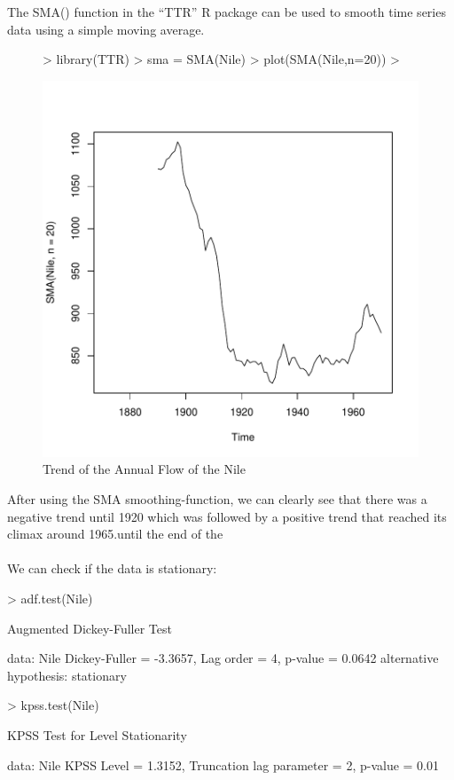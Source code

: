 \documentclass[10pt, a4paper]{article} %
\begin{document}
\noindent The SMA() function in the “TTR” R package can be used to smooth time series data using a simple moving average. 
\begin{figure}[H]
\centering
\begin{Schunk}
\begin{Sinput}
> library(TTR)
> sma = SMA(Nile)
> plot(SMA(Nile,n=20))
> 
\end{Sinput}
\end{Schunk}
\includegraphics{FINAL_VERSION-083}
\caption{Trend of the Annual Flow of the Nile}
\end{figure}
\pagebreak
\noindent After using the SMA smoothing-function, we can clearly see that there was a negative trend until 1920 which was followed by a positive trend that reached its climax around 1965.until the end of the \\
\\
\noindent We can check if the data is stationary:
\begin{Schunk}
\begin{Sinput}
> adf.test(Nile)
\end{Sinput}
\begin{Soutput}
	Augmented Dickey-Fuller Test

data:  Nile
Dickey-Fuller = -3.3657, Lag order = 4, p-value =
0.0642
alternative hypothesis: stationary
\end{Soutput}
\begin{Sinput}
> kpss.test(Nile)
\end{Sinput}
\begin{Soutput}
	KPSS Test for Level Stationarity

data:  Nile
KPSS Level = 1.3152, Truncation lag parameter = 2,
p-value = 0.01
\end{Soutput}
\end{Schunk}
\end{document}
